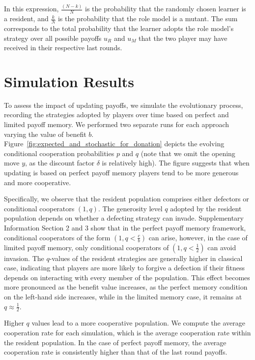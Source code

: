 \documentclass[11pt]{article}
\theoremstyle{plainCl1}
\theoremstyle{plainCl2}
\begin{document}
In this expression, $\frac{(N\!-\!k)}{N}$ is the probability that the randomly
chosen learner is a resident, and $\frac{k}{N}$ is the probability that the role
model is a mutant. The sum corresponds to the total probability that the learner
adopts the role model's strategy over all possible payoffs $u_R$ and $u_M$ that
the two player may have received in their respective last rounds.

\section{Simulation Results}

To assess the impact of updating payoffs, we simulate the evolutionary process,
recording the strategies adopted by players over time based on perfect and
limited payoff memory. We performed two separate runs for each approach varying
the value of benefit \(b\).
Figure~\ref{fig:expected_and_stochastic_for_donation} depicts the evolving
conditional cooperation probabilities $p$ and $q$ (note that we omit the opening
move \(y\), as the discount factor \(\delta\) is relatively high). The figure
suggests that when updating is based on perfect payoff memory players tend to be
more generous and more cooperative.

Specifically, we observe that the resident population comprises either defectors
or conditional cooperators \((1, q)\). The generosity level \(q\) adopted by the
resident population depends on whether a defecting strategy can invade.
Supplementary Information Section 2 and 3 show that in the perfect payoff memory
framework, conditional cooperators of the form \((1, q < \frac{c}{b})\) can
arise, however, in the case of limited payoff memory, only conditional
cooperators of \((1, q < \frac{1}{2})\) can avoid invasion. 
The $q$-values of the resident strategies are generally higher in classical
case, indicating that players are more likely to forgive a defection if their fitness
depends on interacting with every member of the population. This effect becomes
more pronounced as the benefit value increases, as the perfect memory condition
on the left-hand side increases, while in the limited memory case, it remains at
\(q \approx \frac{1}{2}\).

Higher $q$ values lead to a more cooperative population. We compute the average
cooperation rate for each simulation, which is the average cooperation rate
within the resident population. In the case of perfect payoff memory, the
average cooperation rate is consistently higher than that of the last round
payoffs.
\end{document}
